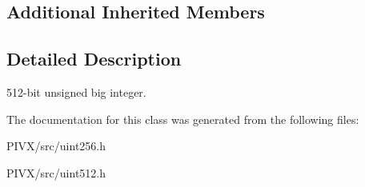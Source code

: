 \subsection*{Additional Inherited Members}


\subsection{Detailed Description}
512-\/bit unsigned big integer. 

The documentation for this class was generated from the following files\+:\begin{DoxyCompactItemize}
\item 
P\+I\+V\+X/src/uint256.\+h\item 
P\+I\+V\+X/src/uint512.\+h\end{DoxyCompactItemize}
